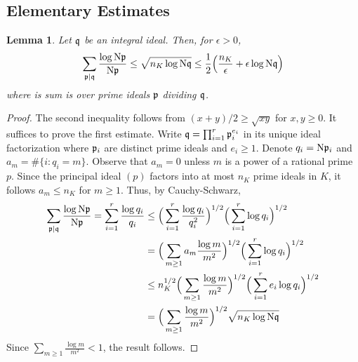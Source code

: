 \documentclass[12pt,psamsfonts]{amsart}
\newtheorem{lem}[thm]{Lemma}
\theoremstyle{definition}
\theoremstyle{remark}
\numberwithin{equation}{section}
\begin{document}
\subsection{Elementary Estimates}
\label{Elementary}
\begin{lem} \label{ImprimitiveQ} Let $\mathfrak{q}$ be an integral ideal. Then, for $\epsilon > 0$, 
\[
\sum_{\mathfrak{p} \mid \mathfrak{q}} \frac{\log \mathrm{N}\mathfrak{p}}{\mathrm{N}\mathfrak{p}} \leq \sqrt{ n_K \log \mathrm{N}\mathfrak{q} } \leq \frac{1}{2}\Big( \frac{n_K}{\epsilon} + \epsilon \log \mathrm{N}\mathfrak{q} \Big)
\]
where is sum is over prime ideals $\mathfrak{p}$ dividing $\mathfrak{q}$.
\end{lem}
\begin{proof} The second inequality follows from $(x+y)/2 \geq \sqrt{xy}$ for $x,y \geq 0$. It suffices to prove the first estimate. 
Write $\mathfrak{q} = \prod_{i=1}^r \mathfrak{p}_i^{e_i}$ in its unique ideal factorization where $\mathfrak{p}_i$ are  distinct prime ideals and $e_i \geq 1$. Denote $q_i = \mathrm{N}\mathfrak{p}_i$ and $a_m = \#\{ i : q_i = m\}$. Observe that $a_m = 0$ unless $m$ is a power of a rational prime $p$. Since the principal ideal $(p)$ factors into at most $n_K$ prime ideals in $K$, it follows $a_m \leq n_K$ for $m \geq 1$. Thus, by Cauchy-Schwarz,
\begin{align*}
\sum_{\mathfrak{p} \mid \mathfrak{q}} \frac{\log \mathrm{N}\mathfrak{p}}{\mathrm{N}\mathfrak{p}} 
= \sum_{i=1}^r \frac{\log q_i}{q_i} 
& \leq \Big(\sum_{i=1}^r \frac{\log q_i}{q_i^2} \Big)^{1/2} \Big( \sum_{i=1}^r \log q_i\Big)^{1/2}  \\
& = \Big(\sum_{m \geq 1} a_m \frac{\log m}{m^2} \Big)^{1/2} \Big( \sum_{i=1}^r \log q_i\Big)^{1/2}  \\
& \leq n_K^{1/2} \Big(\sum_{m \geq 1} \frac{\log m}{m^2} \Big)^{1/2} \Big( \sum_{i=1}^r e_i \log q_i\Big)^{1/2}  \\
& =  \Big(\sum_{m \geq 1} \frac{\log m}{m^2} \Big)^{1/2}\sqrt{n_K \log \mathrm{N}\mathfrak{q}} 
\end{align*}
Since $\sum_{m \geq 1} \frac{\log m}{m^2} < 1$, the result follows. 
\end{proof}
\end{document}
